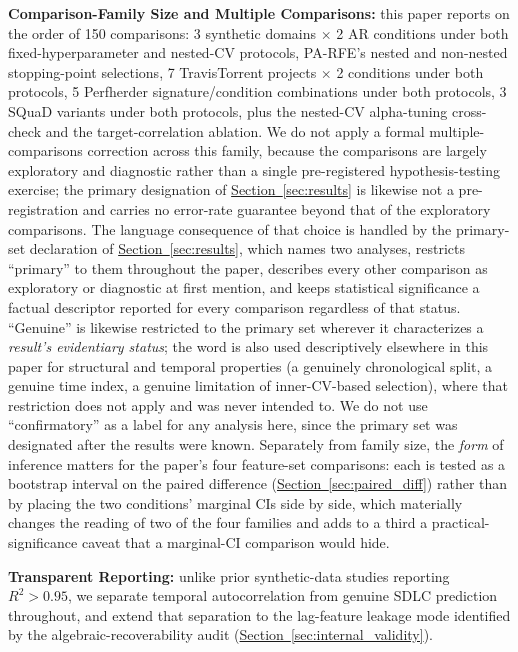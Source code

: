 \documentclass[technologies,article,submit,pdftex,moreauthors]{Definitions/mdpi}
\begin{document}
\textbf{Comparison-Family Size and Multiple Comparisons:} this paper reports on the order of 150 comparisons: 3 synthetic domains \(\times\) 2 AR conditions under both fixed-hyperparameter and nested-CV protocols, PA-RFE's nested and non-nested stopping-point selections, 7 TravisTorrent projects \(\times\) 2 conditions under both protocols, 5 Perfherder signature/condition combinations under both protocols, 3 SQuaD variants under both protocols, plus the nested-CV alpha-tuning cross-check and the target-correlation ablation. We do not apply a formal multiple-comparisons correction across this family, because the comparisons are largely exploratory and diagnostic rather than a single pre-registered hypothesis-testing exercise; the primary designation of \hyperref[sec:results]{Section~\ref*{sec:results}} is likewise not a pre-registration and carries no error-rate guarantee beyond that of the exploratory comparisons. The language consequence of that choice is handled by the primary-set declaration of \hyperref[sec:results]{Section~\ref*{sec:results}}, which names two analyses, restricts ``primary'' to them throughout the paper, describes every other comparison as exploratory or diagnostic at first mention, and keeps statistical significance a factual descriptor reported for every comparison regardless of that status. ``Genuine'' is likewise restricted to the primary set wherever it characterizes a \emph{result's evidentiary status}; the word is also used descriptively elsewhere in this paper for structural and temporal properties (a genuinely chronological split, a genuine time index, a genuine limitation of inner-CV-based selection), where that restriction does not apply and was never intended to. We do not use ``confirmatory'' as a label for any analysis here, since the primary set was designated after the results were known. Separately from family size, the \emph{form} of inference matters for the paper's four feature-set comparisons: each is tested as a bootstrap interval on the paired difference (\hyperref[sec:paired_diff]{Section~\ref*{sec:paired_diff}}) rather than by placing the two conditions' marginal CIs side by side, which materially changes the reading of two of the four families and adds to a third a practical-significance caveat that a marginal-CI comparison would hide.

\textbf{Transparent Reporting:} unlike prior synthetic-data studies reporting \(R^2 > 0.95\), we separate temporal autocorrelation from genuine SDLC prediction throughout, and extend that separation to the lag-feature leakage mode identified by the algebraic-recoverability audit (\hyperref[sec:internal_validity]{Section~\ref*{sec:internal_validity}}).
\end{document}
